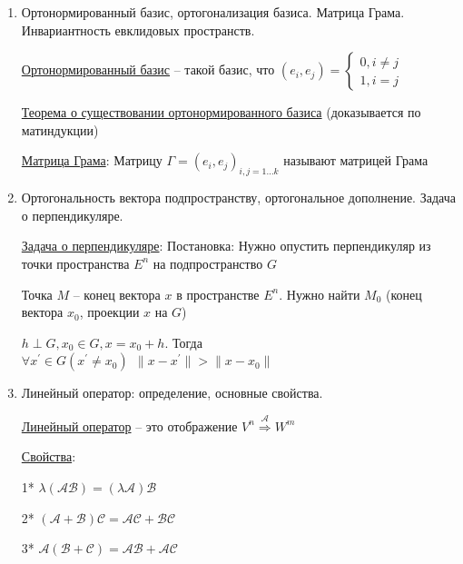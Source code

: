 \documentclass[12pt]{article}
\begin{document}
\begin{enumerate}
        \item Ортонормированный базис, ортогонализация базиса. Матрица Грама. Инвариантность евклидовых пространств.

        \hyperlink{ortonormalizedbasis}{Ортонормированный базис} -- такой базис, что $(e_i, e_j) = \begin{cases}
                                                                                                      0, i \neq j \\ 1, i = j
        \end{cases}$

        \hyperlink{orthogonalbasisinspace}{Теорема о существовании ортонормированного базиса} (доказывается по матиндукции)


        \hyperlink{grammatrix}{Матрица Грама}: Матрицу $\Gamma = {(e_i, e_j)}_{i, j = 1\dots k}$ называют матрицей Грама

        \item Ортогональность вектора подпространству, ортогональное дополнение. Задача о перпендикуляре.

        \hyperlink{perpendicularproblem}{Задача о перпендикуляре}: Постановка: Нужно опустить перпендикуляр из точки пространства $E^n$ на подпространство $G$

        Точка $M$ -- конец вектора $x$ в пространстве $E^n$.
        Нужно найти $M_0$ (конец вектора $x_0$, проекции $x$ на $G$)

        \begin{MyTheorem}
            \Ths $h \perp G, x_0 \in G, x = x_0 + h$. Тогда $\forall x^\prime \in G (x^\prime \neq x_0) \ \ \|x - x^\prime\| > \|x - x_0\|$
        \end{MyTheorem}

        \item Линейный оператор: определение, основные свойства.

        \hyperlink{linearoperatordefinition}{Линейный оператор} -- это отображение $V^n \stackrel{\mathcal{A}}{\Longrightarrow} W^m$

        \hyperlink{linearoperatorproperties}{Свойства}:

        1* $\lambda (\mathcal{A}\mathcal{B}) = (\lambda \mathcal{A})\mathcal{B}$

        2* $(\mathcal{A} + \mathcal{B}) \mathcal{C} = \mathcal{A}\mathcal{C} + \mathcal{B}\mathcal{C}$

        3* $\mathcal{A} (\mathcal{B} + \mathcal{C}) = \mathcal{A}\mathcal{B} + \mathcal{A}\mathcal{C}$


\end{enumerate}
\end{document}
